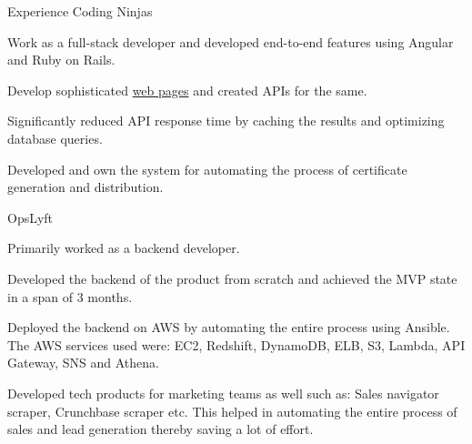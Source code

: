 \documentclass[]{resume-knyte}
\begin{document}
\begin{topic}{Experience}
    {Coding Ninjas}
    {\begin{tightitemize}
        \item Work as a full-stack developer and developed end-to-end features using Angular and Ruby on Rails.
        \item Develop sophisticated \href{https://www.codingninjas.com/courses/premium-foundation-course}{web pages} and created APIs for the same.
        \item Significantly reduced API response time by caching the results and optimizing database queries.
        \item Developed and own the system for automating the process of certificate generation and distribution.
    \end{tightitemize}}
    {OpsLyft}
    {\begin{tightitemize}
        \item Primarily worked as a backend developer.
        \item Developed the backend of the product from scratch and achieved the MVP state in a span of 3 months.
        \item Deployed the backend on AWS by automating the entire process using Ansible. The AWS services used were: EC2, Redshift, DynamoDB, ELB, S3, Lambda, API Gateway, SNS and Athena.
        \item Developed tech products for marketing teams as well such as: Sales navigator scraper, Crunchbase scraper etc. This helped in automating the entire process of sales and lead generation thereby saving a lot of effort.
    \end{tightitemize}}
\end{topic}
\end{document}
